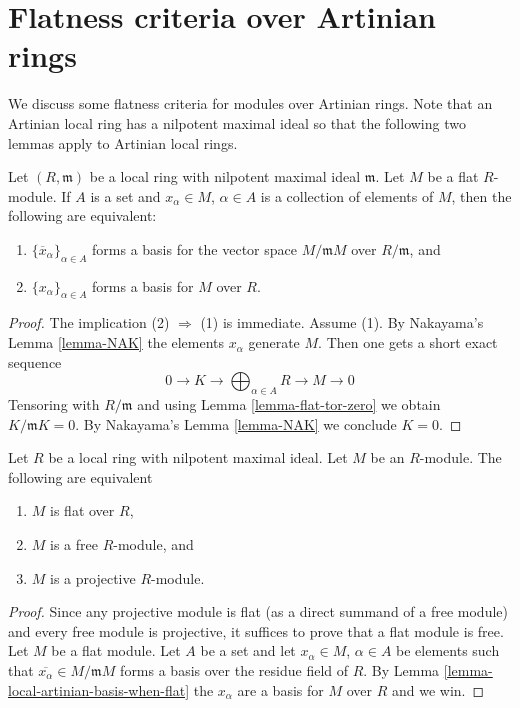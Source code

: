 \section{Flatness criteria over Artinian rings}
\label{section-flatness-artinian}

\noindent
We discuss some flatness criteria for modules over Artinian rings.
Note that an Artinian local ring has a nilpotent maximal ideal
so that the following two lemmas apply to Artinian local rings.

\begin{lemma}
\label{lemma-local-artinian-basis-when-flat}
Let $(R, \mathfrak m)$ be a local ring with nilpotent maximal ideal
$\mathfrak m$. Let $M$ be a flat $R$-module.
If $A$ is a set and $x_\alpha \in M$, $\alpha \in A$ is a collection
of elements of $M$, then the following are equivalent:
\begin{enumerate}
\item $\{\overline{x}_\alpha\}_{\alpha \in A}$ forms a basis
for the vector space $M/\mathfrak mM$ over $R/\mathfrak m$, and
\item $\{x_\alpha\}_{\alpha \in A}$ forms a basis for $M$ over $R$.
\end{enumerate}
\end{lemma}

\begin{proof}
The implication (2) $\Rightarrow$ (1) is immediate.
Assume (1). By Nakayama's Lemma \ref{lemma-NAK}
the elements $x_\alpha$ generate $M$. Then one gets a short exact
sequence
$$
0 \to K \to \bigoplus\nolimits_{\alpha \in A} R \to M \to 0
$$
Tensoring with $R/\mathfrak m$ and using Lemma \ref{lemma-flat-tor-zero}
we obtain $K/\mathfrak mK = 0$. By Nakayama's Lemma \ref{lemma-NAK}
we conclude $K = 0$.
\end{proof}

\begin{lemma}
\label{lemma-local-artinian-characterize-flat}
Let $R$ be a local ring with nilpotent maximal ideal. Let $M$ be an $R$-module.
The following are equivalent
\begin{enumerate}
\item $M$ is flat over $R$,
\item $M$ is a free $R$-module, and
\item $M$ is a projective $R$-module.
\end{enumerate}
\end{lemma}

\begin{proof}
Since any projective module is flat (as a direct summand of a free module)
and every free module is projective, it suffices to prove that a flat module
is free. Let $M$ be a flat module. Let $A$ be a set and let $x_\alpha \in M$,
$\alpha \in A$ be elements such that
$\overline{x_\alpha} \in M/\mathfrak m M$ forms a basis over the residue
field of $R$. By
Lemma \ref{lemma-local-artinian-basis-when-flat}
the $x_\alpha$ are a basis for $M$ over $R$ and we win.
\end{proof}

